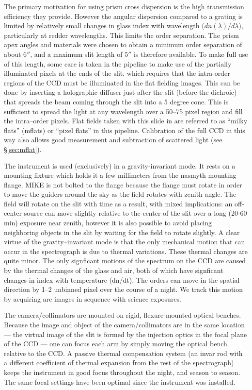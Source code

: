 \documentclass[12pt,preprint]{aastex}
\begin{document}
The primary motivation for using prism cross dispersion is the high
transmission efficiency they provide.  However the angular dispersion
compared to a grating is limited by relatively small changes in glass
index with wavelength ($dn(\lambda)/d\lambda$), particularly at redder
wavelengths. This limits the order separation.  The prism apex angles
and materials were chosen to obtain a minimum order separation of
about $6''$, and a maximum slit length of $5''$ is therefore
available.  To make full use of this length, some care is taken in the
pipeline to make use of the partially illuminated pixels at the ends
of the slit, which requires that the intra-order regions of the
CCD must be illuminated in the flat fielding images.  This can be done
by inserting a holographic diffuser just after the slit (before the
dichroic) that spreads the beam coming through the slit into a 5
degree cone. This is sufficient to spread the light at any wavelength
over a 50--75 pixel region and fill the intra--order pixels.  Flat
fields taken with this slide in are referred to as ``milky flats''
(mflats) or ``pixel flats'' in this pipeline.  Calibration of the
full CCD in this way also allows good measurement and subtraction
of scattered light  (see \S \ref{sec:mflat}).

The instrument is used (exclusively) in a gravity-invariant mode.  It
rests on a mounting fixture which holds it a few millimeters from the
nasmyth mounting flange.  MIKE is not bolted to the flange because the
flange must rotate in order to move the guiders around the sky as the
field rotates with zenith angle. The field will rotate on the slit
with time as a result, with mixed implications: an off-center source
can move slightly relative to the center of the slit over a long
(20-60 min) exposure near zenith, however it is also possible to avoid
placing neighboring objects in the slit by waiting for the field to
rotate slightly.  A clear virtue of the gravity--invariant mode is
that the only mechanical motion that can occur in the spectrograph is
due to thermal variations. These thermal changes are quite minor.
The only signficant motions of the spectrum on the CCD are caused by
the thermal changes of the glass and air, both of which have
signficant changes in index with temperature (dn/dt).  The orders can
move in the spatial direction by 1--2 unbinned pixel over the course
of a night.  We track this motion by acquiring arc images in
sequence with science exposures.

The camera/collimators are mounted on rigid, flexure-mounted optical
benches.  Because the image and object of the camera/collimators are
in the same location --- the virtual image of the slit is formed by
the injection optics in the focal plane of the CCD --- one can focus
each arm by simply moving the optical bench relative to the CCD.  A
passive thermal compensation system (an invar rod with a different
coefficient of thermal expansion from the rest of the spectrograph)
keeps the instrument in good focus throughout the night, and season to
season. The same focal settings have been optimal since the
instrument was installed.
\end{document}
